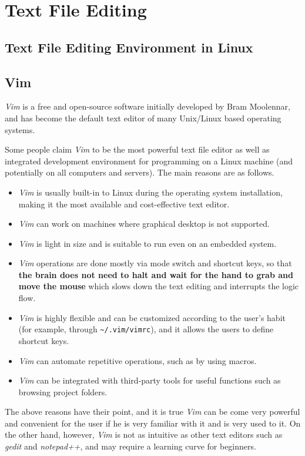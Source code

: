 \chapter{Text File Editing}


\section{Text File Editing Environment in Linux}

\section{Vim}

\textit{Vim} is a free and open-source software initially developed by Bram Moolennar, and has become the default text editor of many Unix/Linux based operating systems.

Some people claim \textit{Vim} to be the most powerful text file editor as well as integrated development environment for programming on a Linux machine (and potentially on all computers and servers). The main reasons are as follows.
\begin{itemize}
  \item \textit{Vim} is usually built-in to Linux during the operating system installation, making it the most available and cost-effective text editor.
  \item \textit{Vim} can work on machines where graphical desktop is not supported.
  \item \textit{Vim} is light in size and is suitable to run even on an embedded system.
  \item \textit{Vim} operations are done mostly via mode switch and shortcut keys, so that \textbf{the brain does not need to halt and wait for the hand to grab and move the mouse} which slows down the text editing and interrupts the logic flow.
  \item \textit{Vim} is highly flexible and can be customized according to the user's habit (for example, through \verb|~/.vim/vimrc|), and it allows the users to define shortcut keys.
  \item \textit{Vim} can automate repetitive operations, such as by using macros.
  \item \textit{Vim} can be integrated with third-party tools for useful functions such as browsing project folders.
\end{itemize}
The above reasons have their point, and it is true \textit{Vim} can be come very powerful and convenient for the user if he is very familiar with it and is very used to it. On the other hand, however, \textit{Vim} is not as intuitive as other text editors such as \textit{gedit} and \textit{notepad++}, and may require a learning curve for beginners.

